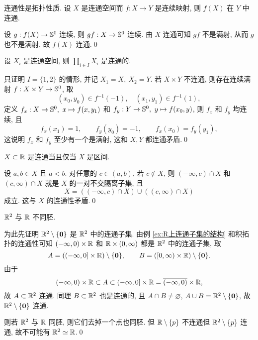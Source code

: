     \begin{Proposition}
        连通性是拓扑性质. 设 $ X $ 是连通空间而 $ f : X\to Y $ 是连续映射, 则 $ f(X) $ 在 $ Y $ 中连通.
    \end{Proposition}
    \begin{Proof}
        设 $ g : f(X)\to\S^0 $ 连续, 则 $ gf : X\to\S^0 $ 连续. 由 $ X $ 连通可知 $ gf $ 不是满射, 从而 $ g $ 也不是满射, 故 $ f(X) $ 连通.\qed
    \end{Proof}

    \begin{Proposition}[积拓扑的连通性]
        设 $ X_i $ 是连通空间, 则 $ \prod_{i\in I}X_i $ 是连通的.
    \end{Proposition}
    \begin{Proof}
        只证明 $ I=\{1,2\} $ 的情形, 并记 $ X_1=X,\ X_2=Y $. 若 $ X\times Y $ 不连通, 则存在连续满射 $ f : X\times Y\to\S^0 $, 取
        \[
            (x_0,y_0)\in f^{-1}(-1),\quad (x_1,y_1)\in f^{-1}(1),
        \]
        定义 $ f_x : X\to\S^0,\ x\mapsto f(x,y_1) $ 和 $ f_y : Y\to\S^0,\ y\mapsto f(x_0,y) $, 则 $ f_x $ 和 $ f_y $ 均连续, 且
        \[
            f_x(x_1)=1,\qquad f_y(y_0)=-1,\qquad f_x(x_0)=f_y(y_1),
        \]
        这说明 $ f_x $ 和 $ f_y $ 至少有一个是满射, 这和 $ X, Y $ 都连通矛盾.\qed
    \end{Proof}

    \begin{Example}[$ \R $ 上连通子集的结构]\label{ex:R上连通子集的结构}
        $ X\subset\R $ 是连通当且仅当 $ X $ 是区间.
    \end{Example}
    \begin{Proof}
        设 $ a, b\in X $ 且 $ a<b $. 对任意的 $ c\in(a,b) $, 若 $ c\notin X $, 则 $ (-\infty,c)\cap X $ 和 $ (c,\infty)\cap X $ 就是 $ X $ 的一对不交隔离子集, 且
        \[
            X=((-\infty,c)\cap X)\cup((c,\infty)\cap X)
        \]
        成立. 这与 $ X $ 的连通性矛盾.\qed
    \end{Proof}

    \begin{Example}
        $ \R^2 $ 与 $ \R $ 不同胚.
    \end{Example}
    \begin{Proof}
        为此先证明 $ \R^2\sm\{\mathbf{0}\} $ 是 $ \R^2 $ 中的连通子集. 由例 \ref{ex:R上连通子集的结构} 和积拓扑的连通性可知 $ (-\infty,0)\times\R $ 和 $ \R\times(0,\infty) $ 都是 $ \R^2 $ 中的连通子集, 取
        \[
            A=((-\infty,0]\times\R)\sm\{\mathbf{0}\},\qquad B=([0,\infty)\times\R)\sm\{\mathbf{0}\}.
        \]
        由于
        \[
            (-\infty,0)\times\R\subset A\subset(-\infty,0]\times\R=\baro{(-\infty,0)}\times\R,
        \]
        故 $ A\subset\R^2 $ 连通. 同理 $ B\subset\R^2 $ 也是连通的, 且 $ A\cap B\ne\varnothing $, $ A\cup B=\R^2\sm\{\mathbf{0}\} $, 故 $ \R^2\sm\{\mathbf{0}\} $ 连通.

        则若 $ \R^2 $ 与 $ \R $ 同胚, 则它们去掉一个点也同胚. 但 $ \R\sm\{p\} $ 不连通但 $ \R^2\sm\{p\} $ 连通, 故不可能有 $ \R^2\simeq\R $.\qed
    \end{Proof}

